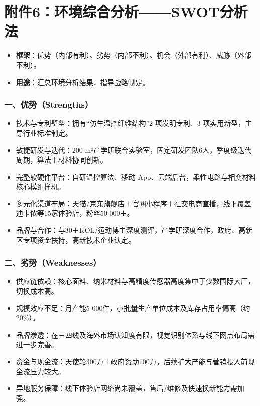 \documentclass[UTF8]{report}
\theoremstyle{MyLineTheoremStyle} %
\theoremstyle{MyBlockTheoremStyle} %
\theoremstyle{MySubsubsectionStyle} %
\begin{document}
\section{附件6：环境综合分析——SWOT分析法}
\begin{itemize}
    \item \textbf{框架}：优势（内部有利）、劣势（内部不利）、机会（外部有利）、威胁（外部不利）。
    \item \textbf{用途}：汇总环境分析结果，指导战略制定。
\end{itemize}

    \subsubsection{一、优势（Strengths）}
    \begin{itemize}
      \item 技术与专利壁垒：拥有“仿生温控纤维结构”2 项发明专利、3 项实用新型，主导行业标准制定。  
      \item 敏捷研发与迭代：200 m²产学研联合实验室，固定研发团队6人，季度级迭代周期，算法＋材料协同创新。  
      \item 完整软硬件平台：自研温控算法、移动 App、云端后台，柔性电路与相变材料核心模组样机。  
      \item 多元化渠道布局：天猫/京东旗舰店＋官网小程序＋社交电商直播，线下覆盖迪卡侬等15家体验店，粉丝50 000＋。  
      \item 品牌与合作：与30＋KOL/运动博主深度测评，产学研深度合作，政府、高新区专项资金扶持，高新技术企业认定。
    \end{itemize}

  \subsubsection{二、劣势（Weaknesses）}
    \begin{itemize}
      \item 供应链依赖：核心面料、纳米材料与高精度传感器高度集中于少数国际大厂，切换成本高。  
      \item 规模效应不足：月产能5 000件，小批量生产单位成本及库存占用率偏高（约20\%）。  
      \item 品牌渗透：在三四线及海外市场认知度有限，视觉识别体系与线下网点布局需进一步完善。  
      \item 资金与现金流：天使轮300万＋政府资助100万，后续扩大产能与营销投入前现金流压力较大。  
      \item 异地服务保障：线下体验店网络尚未覆盖，售后/维修及快速换新能力需加强。
    \end{itemize}
\end{document}
